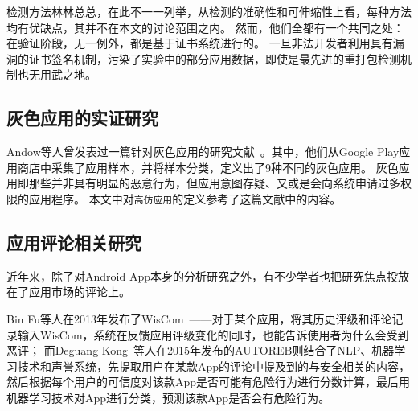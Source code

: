 检测方法林林总总，在此不一一列举，从检测的准确性和可伸缩性上看，每种方法均有优缺点，其并不在本文的讨论范围之内。
然而，他们全都有一个共同之处：在验证阶段，无一例外，都是基于证书系统进行的。
一旦非法开发者利用具有漏洞的证书签名机制，污染了实验中的部分应用数据，即使是最先进的重打包检测机制也无用武之地。

\subsection{灰色应用的实证研究}

Andow等人曾发表过一篇针对灰色应用的研究文献~\cite{Andow2016ASO}。其中，他们从Google Play应用商店中采集了应用样本，并将样本分类，定义出了9种不同的灰色应用。
灰色应用即那些并非具有明显的恶意行为，但应用意图存疑、又或是会向系统申请过多权限的应用程序。
本文中对\texttt{高仿应用}的定义参考了这篇文献中的内容。

\subsection{应用评论相关研究}
近年来，除了对Android App本身的分析研究之外，有不少学者也把研究焦点投放在了应用市场的评论上。

Bin Fu等人在2013年发布了WisCom~\cite{fu2013people}——对于某个应用，将其历史评级和评论记录输入WisCom，系统在反馈应用评级变化的同时，也能告诉使用者为什么会受到恶评；
而Deguang Kong~\cite{kong2015autoreb}等人在2015年发布的AUTOREB则结合了NLP、机器学习技术和声誉系统，先提取用户在某款App的评论中提及到的与安全相关的内容，然后根据每个用户的可信度对该款App是否可能有危险行为进行分数计算，最后用机器学习技术对App进行分类，预测该款App是否会有危险行为。

